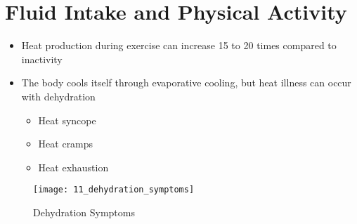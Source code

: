 \documentclass[title={Chapter 11}]{fdsn201notes}
\begin{document}
\section{Fluid Intake and Physical Activity}\label{sec:fluid-intake-and-physical-activity}
\begin{itemize}
	\item Heat production during exercise can increase 15 to 20 times compared to inactivity
	\item The body cools itself through evaporative cooling, but heat illness can occur with dehydration
	\begin{itemize}
		\item Heat syncope
		\item Heat cramps
		\item Heat exhaustion
	\end{itemize}
\end{itemize}

\begin{figure}[H]
	\centering
	\texttt{[image: 11\_dehydration\_symptoms]}
	\caption{Dehydration Symptoms}
	\label{fig:dehydration-symptoms}
\end{figure}
\end{document}
